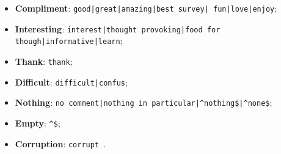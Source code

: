 \begin{itemize} 
 \item \textbf{ Compliment}: \texttt{good\allowbreak|great\allowbreak|amazing\allowbreak|best survey\allowbreak| fun\allowbreak|love\allowbreak|enjoy};
 \item \textbf{Interesting}: \texttt{interest\allowbreak|thought provoking\allowbreak|food for though\allowbreak|informative\allowbreak|learn};
 \item \textbf{Thank}: \texttt{thank};
 \item \textbf{Difficult}: \texttt{difficult\allowbreak|confus};
 \item \textbf{Nothing}: \texttt{no comment\allowbreak|nothing in particular\allowbreak|\^{}nothing\$\allowbreak|\^{}none\$};
 \item \textbf{Empty}: \texttt{\^{}\$};
 \item \textbf{Corruption}: \texttt{corrupt }. 
 \end{itemize}